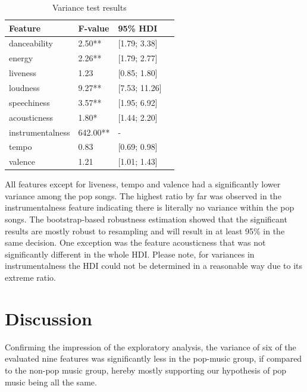 \documentclass{article}
\begin{document}
\begin{table}[h!]
  \caption{Variance test results}
  \label{tab:var}
  \centering
  \begin{tabular}{lllc}
    \toprule
    Feature     & F-value & 95\% HDI\\
    \midrule
	danceability        	&  2.50** & [1.79; 3.38]\\
	energy              		&  2.26** & [1.79; 2.77]\\
	liveness            		&  1.23   & [0.85; 1.80]\\
	loudness            	&  9.27** & [7.53; 11.26]\\
	speechiness         	&  3.57** & [1.95; 6.92]\\
	acousticness        	&  1.80*  & [1.44; 2.20]\\
	instrumentalness    	&642.00** & -\\
	tempo               		&  0.83   & [0.69; 0.98]\\
	valence             	&  1.21   & [1.01; 1.43]\\
    \bottomrule
  \end{tabular}
\end{table}

All features except for liveness, tempo and valence had a significantly lower variance among the pop songs. The highest ratio by far was observed in the instrumentalness feature indicating there is literally no variance within the pop songs.
The bootstrap-based robustness estimation showed that the significant results are mostly robust to resampling and will result in at least 95\% in the same decision. One exception was the feature acousticness that was not significantly different in the whole HDI. Please note, for variances in instrumentalness the HDI could not be determined in a reasonable way due to its extreme ratio.

\section{Discussion}
Confirming the impression of the exploratory analysis, the variance of six of the evaluated nine features was significantly less in the pop-music group, if compared to the non-pop music group, hereby mostly supporting our hypothesis of pop music being all the same.
\end{document}

